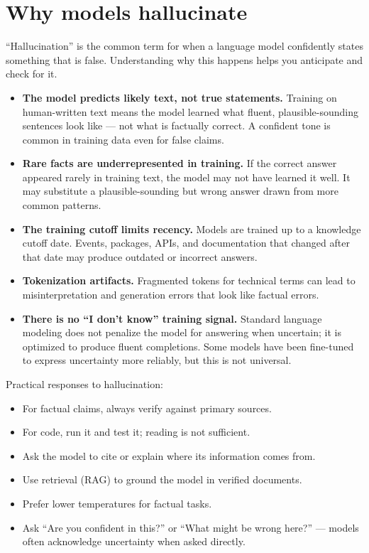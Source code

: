 \section{Why models hallucinate}

``Hallucination'' is the common term for when a language model confidently states something that is false. Understanding why this happens helps you anticipate and check for it.

\begin{itemize}[noitemsep,topsep=0pt]
  \item \textbf{The model predicts likely text, not true statements.} Training on human-written text means the model learned what fluent, plausible-sounding sentences look like --- not what is factually correct. A confident tone is common in training data even for false claims.
  \item \textbf{Rare facts are underrepresented in training.} If the correct answer appeared rarely in training text, the model may not have learned it well. It may substitute a plausible-sounding but wrong answer drawn from more common patterns.
  \item \textbf{The training cutoff limits recency.} Models are trained up to a knowledge cutoff date. Events, packages, APIs, and documentation that changed after that date may produce outdated or incorrect answers.
  \item \textbf{Tokenization artifacts.} Fragmented tokens for technical terms can lead to misinterpretation and generation errors that look like factual errors.
  \item \textbf{There is no ``I don't know'' training signal.} Standard language modeling does not penalize the model for answering when uncertain; it is optimized to produce fluent completions. Some models have been fine-tuned to express uncertainty more reliably, but this is not universal.
\end{itemize}

Practical responses to hallucination:

\begin{itemize}[noitemsep,topsep=0pt]
  \item For factual claims, always verify against primary sources.
  \item For code, run it and test it; reading is not sufficient.
  \item Ask the model to cite or explain where its information comes from.
  \item Use retrieval (RAG) to ground the model in verified documents.
  \item Prefer lower temperatures for factual tasks.
  \item Ask ``Are you confident in this?'' or ``What might be wrong here?'' --- models often acknowledge uncertainty when asked directly.
\end{itemize}

